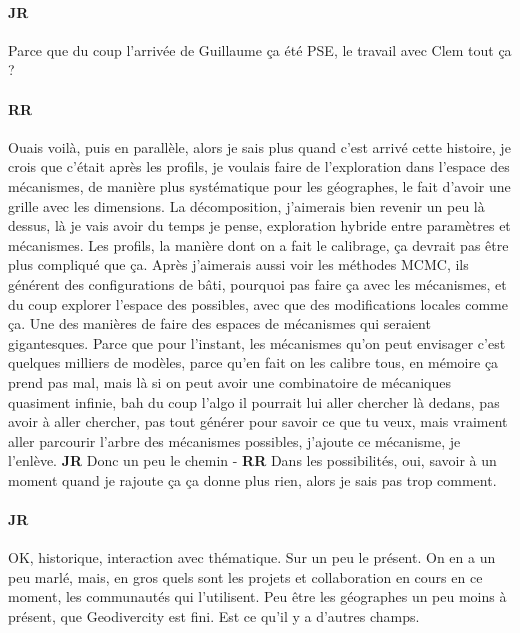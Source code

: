 \documentclass[12pt]{article}
\begin{document}
\paragraph{JR}

Parce que du coup l'arrivée de Guillaume ça été PSE, le travail avec Clem tout ça ?

\paragraph{RR}

Ouais voilà, puis en parallèle, alors je sais plus quand c'est arrivé cette histoire, je crois que c'était après les profils, je voulais faire de l'exploration dans l'espace des mécanismes, de manière plus systématique pour les géographes, le fait d'avoir une grille avec les dimensions. La décomposition, j'aimerais bien revenir un peu là dessus, là je vais avoir du temps je pense, exploration hybride entre paramètres et mécanismes. Les profils, la manière dont on a fait le calibrage, ça devrait pas être plus compliqué que ça. Après j'aimerais aussi voir les méthodes MCMC, ils générent des configurations de bâti, pourquoi pas faire ça avec les mécanismes, et du coup explorer l'espace des possibles, avec que des modifications locales comme ça. Une des manières de faire des espaces de mécanismes qui seraient gigantesques. Parce que pour l'instant, les mécanismes qu'on peut envisager c'est quelques milliers de modèles, parce qu'en fait on les calibre tous, en mémoire ça prend pas mal, mais là si on peut avoir une combinatoire de mécaniques quasiment infinie, bah du coup l'algo il pourrait lui aller chercher là dedans, pas avoir à aller chercher, pas tout générer pour savoir ce que tu veux, mais vraiment aller parcourir l'arbre des mécanismes possibles, j'ajoute ce mécanisme, je l'enlève. \textbf{JR} Donc un peu le chemin - \textbf{RR} Dans les possibilités, oui, savoir à un moment quand je rajoute ça ça donne plus rien, alors je sais pas trop comment.

\paragraph{JR}

OK, historique, interaction avec thématique. Sur un peu le présent. On en a un peu marlé, mais, en gros quels sont les projets et collaboration en cours en ce moment, les communautés qui l'utilisent. Peu être les géographes un peu moins à présent, que Geodivercity est fini. Est ce qu'il y a d'autres champs. 
\end{document}
